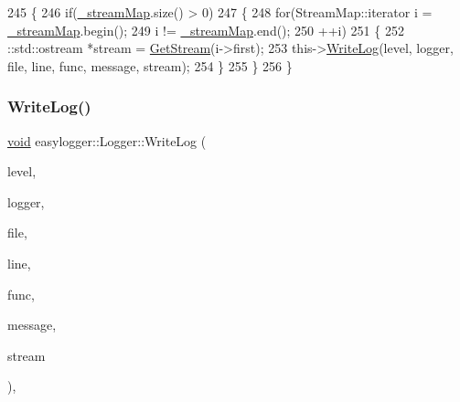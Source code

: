 \begin{DoxyCode}
245                                                                                 \{
246             \textcolor{keywordflow}{if}(\mbox{\hyperlink{classeasylogger_1_1_logger_a9290bed24c12786abef2c421158268f8}{\_streamMap}}.size() > 0)
247             \{
248                 \textcolor{keywordflow}{for}(StreamMap::iterator i = \mbox{\hyperlink{classeasylogger_1_1_logger_a9290bed24c12786abef2c421158268f8}{\_streamMap}}.begin();
249                     i != \mbox{\hyperlink{classeasylogger_1_1_logger_a9290bed24c12786abef2c421158268f8}{\_streamMap}}.end();
250                     ++i)
251                 \{
252                     ::std::ostream *stream = \mbox{\hyperlink{classeasylogger_1_1_logger_ac4a1ce9232d6c0c7ec7668957d4a35ba}{GetStream}}(i->first);
253                     this->\mbox{\hyperlink{classeasylogger_1_1_logger_ac0e7b45cf7f2ce015fd4b510a76bd5b5}{WriteLog}}(level, logger, file, line, func, message, stream);
254                 \}
255             \}
256         \}
\end{DoxyCode}
\mbox{\label{classeasylogger_1_1_logger_a2d09f2ce77a5eb571fb3436967651a12}} 
\subsubsection{\texorpdfstring{Write\+Log()}{WriteLog()}\hspace{0.1cm}{\footnotesize\ttfamily [2/2]}}
{\footnotesize\ttfamily \mbox{\hyperlink{_thread_8h_af1e856da2e658414cb2456cb6f7ebc66}{void}} easylogger\+::\+Logger\+::\+Write\+Log (\begin{DoxyParamCaption}\item[{\mbox{\hyperlink{namespaceeasylogger_a68cb882ead21af982c40e3621fcd50b0}{Log\+Level}}}]{level,  }\item[{\mbox{\hyperlink{classeasylogger_1_1_logger}{Logger}} $\ast$}]{logger,  }\item[{const char $\ast$}]{file,  }\item[{unsigned int}]{line,  }\item[{const char $\ast$}]{func,  }\item[{const char $\ast$}]{message,  }\item[{\+::std\+::ostream $\ast$}]{stream }\end{DoxyParamCaption})\hspace{0.3cm}{\ttfamily [inline]}, {\ttfamily [private]}}

